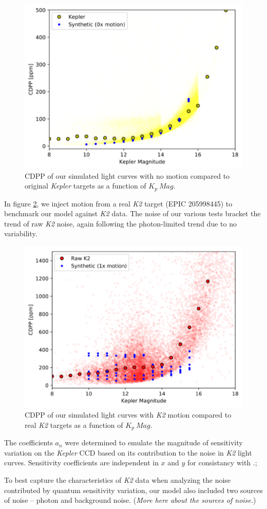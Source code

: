 \documentclass[12pt,preprint]{aastex}
\begin{document}
\begin{figure}[h]
	\centering
	\includegraphics[width=.5\linewidth]{nomotion.png}
	\caption{CDPP of our simulated light curves with no motion compared to original \textit{Kepler} targets as a function of $K_p\ Mag$.}
	\label{fig:nomotion}
\end{figure}

In figure \ref{fig:1motion}, we inject motion from a real \textit{K2} target (EPIC 205998445) to benchmark our model against \textit{K2} data. The noise of our various tests bracket the trend of raw \textit{K2} noise, again following the photon-limited trend due to no variability.

\begin{figure}[h]
	\centering
	\includegraphics[width=.5\linewidth]{1xmotion.png}
	\caption{CDPP of our simulated light curves with \textit{K2} motion compared to real \textit{K2} targets as a function of $K_p\ Mag$.}
	\label{fig:1motion}
\end{figure}

The coefficients $a_n$ were determined to emulate the magnitude of sensitivity variation on the \textit{Kepler} CCD based on its contribution to the noise in \textit{K2} light curves. Sensitivity coefficients are independent in $x$ and $y$ for consistancy with \cite{toyozumi_ashley_2005}.;

To best capture the characteristics of \textit{K2} data when analyzing the noise contributed by quantum sensitivity variation, our model also included two sources of noise -- photon and background noise. (\textit{More here about the sources of noise.})
\end{document}
